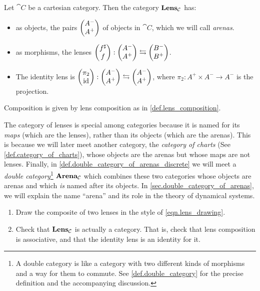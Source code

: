 \documentclass[DynamicalBook]{subfiles}
\begin{document}
\begin{definition}\label{def.lens_category}
Let $\cat{C}$ be a cartesian category. Then the category $\textbf{Lens}_{\mathcal{C}}$
has:
\begin{itemize}
\item as objects, the pairs $\begin{pmatrix}{A^-} \\ {A^+} \end{pmatrix}$ of objects in $\cat{C}$, which we will
  call \emph{arenas}.
\item as morphisms, the lenses $\begin{pmatrix}{f^{\sharp}} \\ {f} \end{pmatrix} : \begin{pmatrix}{A^-} \\ {A^+} \end{pmatrix} \leftrightarrows \begin{pmatrix}{B^-} \\ {B^+} \end{pmatrix}$.
\item The identity lens is $\begin{pmatrix}{\pi_2} \\ {\mathrm{id}} \end{pmatrix} : \begin{pmatrix}{A^-} \\ {A^+} \end{pmatrix} \leftrightarrows
  \begin{pmatrix}{A^-} \\ {A^+} \end{pmatrix}$, where $\pi_2 : A^+ \times A^- \to A^-$ is the projection.
\end{itemize}
\item Composition is given by lens composition as in \cref{def.lens_composition}.
\end{definition}

\begin{remark}
  The category of lenses is special among categories because it is named for its
  \emph{maps} (which are the lenses), rather than its objects (which are the
  arenas). This is because we will later meet another category, the
  \emph{category of charts} (See \cref{def.category_of_charts}), whose objects are
  the arenas but whose maps are not lenses. Finally, in
  \cref{def.double_category_of_arenas_discrete} we will meet a \emph{double
    category}\footnote{A double category is like a category with two different
    kinds of morphisms and a way for them to commute. See
    \cref{def.double_category} for the precise definition and the accompanying
    discussion.} $\textbf{Arena}_{\mathcal{C}}$ which combines these two categories whose objects
  are arenas and which \emph{is} named after its objects. In
  \cref{sec.double_category_of_arenas}, we will explain the name ``arena'' and
  its role in the theory of dynamical systems.
\end{remark}

\begin{exercise}
  \begin{enumerate}
  	\item Draw the composite of two lenses in the style of \eqref{eqn.lens_drawing}.
   	\item Check that $\textbf{Lens}_{\mathcal{C}}$ is actually a category. That is, check that
    lens composition is associative, and that the identity lens is an identity for it.
  \qedhere
  \end{enumerate}
\end{exercise}
\end{document}
